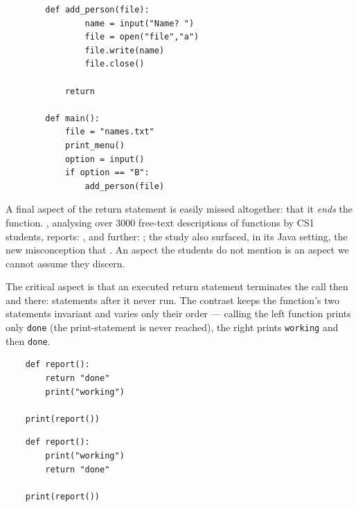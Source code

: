\begin{description}
\begin{verbatim}
        def add_person(file):
                name = input("Name? ")
                file = open("file","a")
                file.write(name)
                file.close()
                
            return

        def main():
            file = "names.txt"
            print_menu()
            option = input()
            if option == "B":
                add_person(file)
        \end{verbatim}
\hfill

\end{description}

A final aspect of the return statement is easily missed altogether: that it
\emph{ends} the function.
\textcite{Esche2025Return}, analysing over 3000 free-text descriptions of
functions by CS1 students, reports:
, and further:
; the study also
surfaced, in its Java setting, the new misconception that
.
An aspect the students do not mention is an aspect we cannot assume they
discern.


The critical aspect is that an executed return statement terminates the call
then and there: statements after it never run.
The contrast keeps the function's two statements invariant and varies only
their order --- calling the left function prints only \texttt{done}
(the print-statement is never reached), the right prints
\texttt{working} and then \texttt{done}.

\hfill
\begin{minipage}[t]{0.45\columnwidth}
  \begin{verbatim}
    def report():
        return "done"
        print("working")

    print(report())
  \end{verbatim}
\end{minipage}
\hfill
\begin{minipage}[t]{0.45\columnwidth}
  \begin{verbatim}
    def report():
        print("working")
        return "done"

    print(report())
  \end{verbatim}
\end{minipage}

